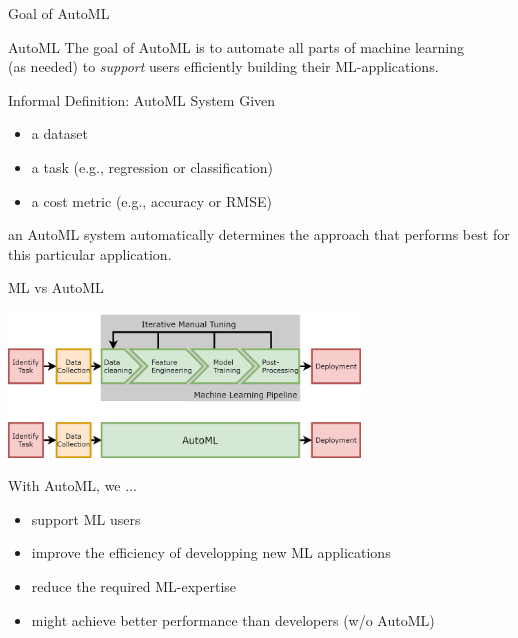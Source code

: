 \begin{frame}[c]{Goal of AutoML}

\begin{block}{AutoML}
The goal of AutoML is to automate all parts of machine learning\\ (as needed)
to \emph{support} users efficiently building their ML-applications.
\end{block}

\bigskip
\pause

\begin{block}{Informal Definition: AutoML System}
Given
\begin{itemize}
  \item a dataset
  \item a task (e.g., regression or classification)
  \item a cost metric (e.g., accuracy or RMSE)
\end{itemize}
an AutoML system automatically determines the approach 
that performs best for this particular application.
\end{block}

\end{frame}
\begin{frame}[c]{ML vs AutoML}

\begin{center}
\includegraphics[width=0.7\textwidth]{images/AutoMLPipeline.jpg}
\end{center}

\bigskip
With AutoML, we ...
\begin{itemize}
	\item support ML users
	\item improve the efficiency of developping new ML applications
	\item reduce the required ML-expertise 
	\item might achieve better performance than developers (w/o AutoML)
\end{itemize}

\end{frame}
